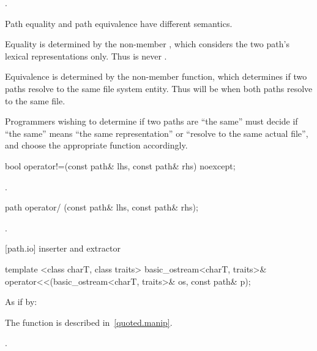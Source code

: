 \begin{itemdescr}
\pnum
\returns {}.

\pnum
\begin{note} Path equality and path equivalence have different semantics.

\pnum
Equality is determined by the  non-member , which considers the two path's lexical
  representations only. Thus  is never .

\pnum
Equivalence is determined by the  non-member function, which determines if two paths resolve to the same file system entity.
  Thus  will be  when both paths resolve to the same file.

\pnum
Programmers wishing to determine if two paths are ``the same'' must decide if
  ``the same'' means ``the same representation'' or ``resolve to the same actual
  file'', and choose the appropriate function accordingly. \end{note}
\end{itemdescr}

\begin{itemdecl}
bool operator!=(const path& lhs, const path& rhs) noexcept;
\end{itemdecl}

\begin{itemdescr}
\pnum
\returns {}.
\end{itemdescr}

\begin{itemdecl}
path operator/ (const path& lhs, const path& rhs);
\end{itemdecl}

\begin{itemdescr}
\pnum
\returns {}.
\end{itemdescr}

[path.io]{ inserter and extractor}

\begin{itemdecl}
template <class charT, class traits>
  basic_ostream<charT, traits>&
    operator<<(basic_ostream<charT, traits>& os, const path& p);
\end{itemdecl}

\begin{itemdescr}
\pnum
\effects As if by: 
\begin{note} The  function is described in~\ref{quoted.manip}. \end{note}

\pnum
\returns {}.
\end{itemdescr}

